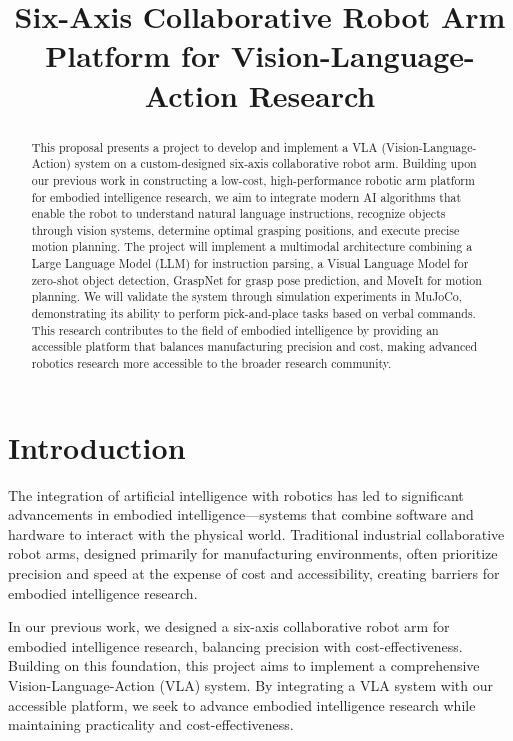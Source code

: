 \documentclass{article}
\title{Six-Axis Collaborative Robot Arm Platform for Vision-Language-Action Research}
\begin{document}
\maketitle


\begin{abstract}
  This proposal presents a project to develop and implement a VLA (Vision-Language-Action) system on a custom-designed six-axis collaborative robot arm. Building upon our previous work in constructing a low-cost, high-performance robotic arm platform for embodied intelligence research, we aim to integrate modern AI algorithms that enable the robot to understand natural language instructions, recognize objects through vision systems, determine optimal grasping positions, and execute precise motion planning. The project will implement a multimodal architecture combining a Large Language Model (LLM) for instruction parsing, a Visual Language Model for zero-shot object detection, GraspNet for grasp pose prediction, and MoveIt for motion planning. We will validate the system through simulation experiments in MuJoCo, demonstrating its ability to perform pick-and-place tasks based on verbal commands. This research contributes to the field of embodied intelligence by providing an accessible platform that balances manufacturing precision and cost, making advanced robotics research more accessible to the broader research community.
\end{abstract}


\section{Introduction}

The integration of artificial intelligence with robotics has led to significant advancements in embodied intelligence—systems that combine software and hardware to interact with the physical world. Traditional industrial collaborative robot arms, designed primarily for manufacturing environments, often prioritize precision and speed at the expense of cost and accessibility, creating barriers for embodied intelligence research.

In our previous work, we designed a six-axis collaborative robot arm for embodied intelligence research, balancing precision with cost-effectiveness. Building on this foundation, this project aims to implement a comprehensive Vision-Language-Action (VLA) system. By integrating a VLA system with our accessible platform, we seek to advance embodied intelligence research while maintaining practicality and cost-effectiveness.
\end{document}
